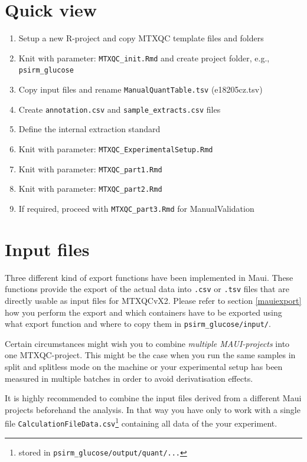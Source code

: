\documentclass[]{book}
\providecommand{\tightlist}{%
  \setlength{\itemsep}{0pt}\setlength{\parskip}{0pt}}
\let\rmarkdownfootnote\footnote%
\def\footnote{\protect\rmarkdownfootnote}
\theoremstyle{definition}
\theoremstyle{definition}
\theoremstyle{definition}
\theoremstyle{remark}
\begin{document}
\section{Quick view}\label{quick-view}

\begin{enumerate}
\def\labelenumi{\arabic{enumi}.}
\tightlist
\item
  Setup a new R-project and copy MTXQC template files and folders
\item
  Knit with parameter: \texttt{MTXQC\_init.Rmd} and create project
  folder, e.g., \texttt{psirm\_glucose}
\item
  Copy input files and rename \texttt{ManualQuantTable.tsv}
  (e18205cz.tsv)
\item
  Create \texttt{annotation.csv} and \texttt{sample\_extracts.csv} files
\item
  Define the internal extraction standard
\item
  Knit with parameter: \texttt{MTXQC\_ExperimentalSetup.Rmd}
\item
  Knit with parameter: \texttt{MTXQC\_part1.Rmd}
\item
  Knit with parameter: \texttt{MTXQC\_part2.Rmd}
\item
  If required, proceed with \texttt{MTXQC\_part3.Rmd} for
  ManualValidation
\end{enumerate}

\section{Input files}\label{input-files}

Three different kind of export functions have been implemented in Maui.
These functions provide the export of the actual data into \texttt{.csv}
or \texttt{.tsv} files that are directly usable as input files for
MTXQCvX2. Please refer to section \ref{mauiexport} how you perform the
export and which containers have to be exported using what export
function and where to copy them in \texttt{psirm\_glucose/input/}.

Certain circumstances might wish you to combine \emph{multiple
MAUI-projects} into one MTXQC-project. This might be the case when you
run the same samples in split and splitless mode on the machine or your
experimental setup has been measured in multiple batches in order to
avoid derivatisation effects.

It is highly recommended to combine the input files derived from a
different Maui projects beforehand the analysis. In that way you have
only to work with a single file
\texttt{CalculationFileData.csv}\footnote{stored in
  \texttt{psirm\_glucose/output/quant/...}} containing all data of the
your experiment.
\end{document}
